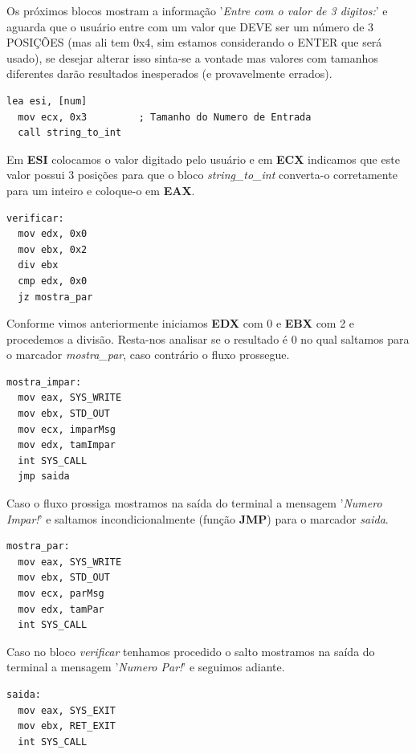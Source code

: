 Os próximos blocos mostram a informação '\textit{Entre com o valor de 3 digitos:}' e aguarda que o usuário entre com um valor que DEVE ser um número de 3 POSIÇÕES (mas ali tem 0x4, sim estamos considerando o ENTER que será usado), se desejar alterar isso sinta-se a vontade mas valores com tamanhos diferentes darão resultados inesperados (e provavelmente errados).
\begin{lstlisting}[]
  lea esi, [num]
  mov ecx, 0x3         ; Tamanho do Numero de Entrada
  call string_to_int
\end{lstlisting}

Em \textbf{ESI} colocamos o valor digitado pelo usuário e em \textbf{ECX} indicamos que este valor possui 3 posições para que o bloco \textit{string\_to\_int} converta-o corretamente para um inteiro e coloque-o em \textbf{EAX}.
\begin{lstlisting}[]
verificar:	
  mov edx, 0x0
  mov ebx, 0x2
  div ebx
  cmp edx, 0x0
  jz mostra_par
\end{lstlisting}

Conforme vimos anteriormente iniciamos \textbf{EDX} com 0 e \textbf{EBX} com 2 e procedemos a divisão. Resta-nos analisar se o resultado é 0 no qual saltamos para o marcador \textit{mostra\_par}, caso contrário o fluxo prossegue.
\begin{lstlisting}[]
mostra_impar:
  mov eax, SYS_WRITE
  mov ebx, STD_OUT
  mov ecx, imparMsg
  mov edx, tamImpar
  int SYS_CALL
  jmp saida
\end{lstlisting}

Caso o fluxo prossiga mostramos na saída do terminal a mensagem '\textit{Numero Impar!}' e saltamos incondicionalmente (função \textbf{JMP}) para o marcador \textit{saida}.
\begin{lstlisting}[]
mostra_par:
  mov eax, SYS_WRITE
  mov ebx, STD_OUT
  mov ecx, parMsg
  mov edx, tamPar
  int SYS_CALL
\end{lstlisting}

Caso no bloco \textit{verificar} tenhamos procedido o salto mostramos na saída do terminal a mensagem '\textit{Numero Par!}' e seguimos adiante.
\begin{lstlisting}[]
saida: 
  mov eax, SYS_EXIT
  mov ebx, RET_EXIT
  int SYS_CALL	
\end{lstlisting}

